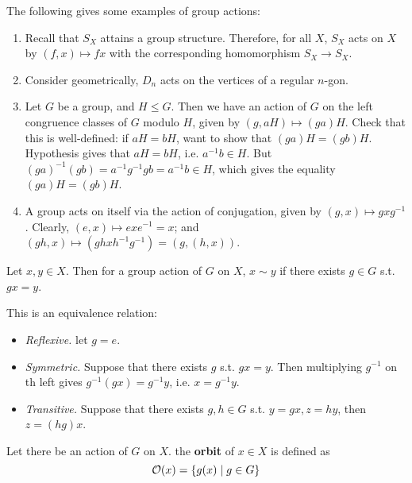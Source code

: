\begin{example}
    The following gives some examples of group actions:
    \begin{enumerate}
        \item Recall that $S_X$ attains a group structure. Therefore, for all $X$, $S_X$ acts on $X$ by $(f, x) \mapsto fx$ with the corresponding homomorphism $S_X \to S_X$.
        \item Consider geometrically, $D_n$ acts on the vertices of a regular $n$-gon.
        \item Let $G$ be a group, and $H \leq G$. Then we have an action of $G$ on the left congruence classes of $G$ modulo $H$, given by $(g, aH) \mapsto (ga) H$. Check that this is well-defined: if $aH = bH$, want to show that $(ga)H = (gb)H$. Hypothesis gives that $aH = bH$, i.e. $a^{-1}b \in H$. But $(ga)^{-1}(gb) = a^{-1} g^{-1} g b = a^{-1}b \in H$, which gives the equality $(ga)H = (gb) H$.
        \item A group acts on itself via the action of conjugation, given by $(g, x) \mapsto gxg^{-1}$. Clearly, $(e, x) \mapsto exe^{-1} = x$; and $(gh, x) \mapsto (ghxh^{-1} g^{-1}) = (g, (h, x))$.
    \end{enumerate}
\end{example}

\begin{definition}
    Let $x, y \in X$. Then for a group action of $G$ on $X$, $x \sim y$ if there exists $g \in G$ s.t. $gx = y$.
\end{definition}

\begin{remark}
    This is an equivalence relation:
    \begin{itemize}
        \item \emph{Reflexive.} let $g = e$.
        \item \emph{Symmetric.} Suppose that there exists $g$ s.t. $gx = y$. Then multiplying $g^{-1}$ on th left gives $g^{-1}(gx) = g^{-1}y$, i.e. $x = g^{-1} y$.
        \item \emph{Transitive.} Suppose that there exists $g, h \in G$ s.t. $y = gx, z = hy$, then $z = (hg)x$.
    \end{itemize}
\end{remark}

\begin{definition}[Orbit]
    Let there be an action of $G$ on $X$. the \textbf{orbit} of $x \in X$ is defined as
    \[
        \mathcal{O}(x) = \{ g(x) \mid g \in G \}
    \]
\end{definition}

